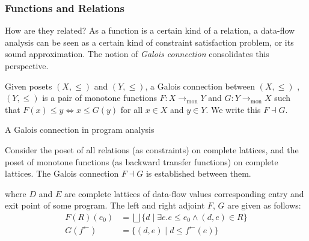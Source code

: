 \documentclass{beamer}
\newcommand{\Pow}{\mathcal{P}}
\newcommand{\Rel}{\mathrm{Rel}}
\newcommand{\Unidir}{\mathrm{Bwd}}
\newcommand{\tomon}{\to_{\mathrm{mon}}}
\newcommand{\fb}{{f^{\leftarrow}}}
\newcommand{\bigjoin}{\bigsqcup}
\begin{document}
\begin{frame}
  \frametitle{Functions and Relations}
  \begin{block}{How are they related?}
    As a function is a certain kind of a relation,
    a data-flow analysis can be seen as a certain kind of constraint satisfaction problem, or its sound approximation.
    The notion of \emph{Galois connection} consolidates this perspective.
  \end{block}
  \begin{definition}
    Given posets $(X, \leq)$ and $(Y, \leq)$, a Galois connection between $(X, \leq)$ , $(Y, \leq)$ is a pair of monotone functions $F : X \tomon Y$ and $G : Y \tomon X$ such that $F(x) \leq y \iff x \leq G(y)$ for all $x \in X$ and $y \in Y$.
    We write this $F \dashv G$.
  \end{definition}
\end{frame}
\begin{frame} [fragile] {A Galois connection in program analysis}
  \begin{block}{}
    Consider the poset of all relations (as constraints) on complete lattices, and the poset of monotone functions (as backward transfer functions) on complete lattices.
    The Galois connection $F \dashv G$ is established between them.
  \begin{center}
  \end{center}
  where $D$ and $E$ are complete lattices of data-flow values corresponding entry and exit point of some program. The left and right adjoint $F$, $G$ are given as follows:
  \begin{align*}
    F (R)(e_{0}) &= \bigjoin \{ d \mid \exists e. e \leq e_{0}  \land (d , e) \in R \} \\
    G (\fb) &= \{ (d , e) \mid d \leq \fb(e) \} \\
  \end{align*}
  \end{block}
\end{frame}
\end{document}
